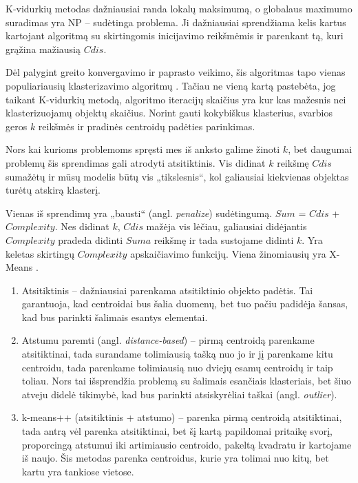 \documentclass{VUMIFInfKursinis}
\newcommand{\ltang}[2]{#1 (angl. \textit{#2})}
\begin{document}
K-vidurkių metodas dažniausiai randa lokalų maksimumą, o globalaus
maximumo suradimas yra NP – sudėtinga problema. Ji dažniausiai
sprendžiama kelis kartus kartojant algoritmą su skirtingomis inicijavimo
reikšmėmis ir parenkant tą, kuri grąžina mažiausią $Cdis$.

Dėl palygint greito konvergavimo ir paprasto veikimo, šis algoritmas
tapo vienas populiariausių klasterizavimo algoritmų
\cite{wu2008top}.
Tačiau ne vieną kartą pastebėta, jog taikant K-vidurkių metodą,
algoritmo iteracijų skaičius yra kur kas mažesnis nei klasterizuojamų
objektų skaičius. Norint gauti kokybiškus klasterius, svarbios geros
$k$ reikšmės ir pradinės centroidų padėties parinkimas.


Nors kai kurioms problemoms spręsti mes iš anksto galime žinoti
$k$, bet daugumai problemų šis sprendimas gali atrodyti
atsitiktinis. Vis didinat $k$ reikšmę $Cdis$ sumažėtų ir mūsų
modelis būtų vis „tikslesnis“, kol galiausiai kiekvienas objektas
turėtų atskirą klasterį.

Vienas iš sprendimų yra \ltang{„bausti“}{penalize} sudėtingumą.
$Sum$ = $Cdis$ + $Complexity$. Nes didinat $k$,
$Cdis$ mažėja vis lėčiau, galiausiai didėjantis $Complexity$
pradeda didinti $Suma$ reikšmę ir tada sustojame didinti $k$.
Yra keletas skirtingų $Complexity$ apskaičiavimo funkcijų. Viena
žinomiausių yra X-Means \cite{pelleg2000x}.


\begin{enumerate}
\item
  Atsitiktinis – dažniausiai parenkama atsitiktinio objekto padėtis.
  Tai garantuoja, kad centroidai bus šalia duomenų, bet tuo pačiu
  padidėja šansas, kad bus parinkti šalimais esantys elementai.
\item
  \ltang{Atstumu paremti}{distance-based} – pirmą centroidą
  parenkame atsitiktinai, tada surandame tolimiausią tašką nuo jo ir jį
  parenkame kitu centroidu, tada parenkame tolimiausią nuo dviejų esamų
  centroidų ir taip toliau. Nors tai išsprendžia problemą su šalimais
  esančiais klasteriais, bet šiuo atveju didelė tikimybė, kad bus
  parinkti \ltang{atsiskyrėliai taškai}{outlier}. 
\item
  k-means++ (atsitiktinis + atstumo) \cite{arthur2007k} – parenka pirmą
  centroidą atsitiktinai, tada antrą vėl parenka atsitiktinai, bet šį
  kartą papildomai pritaikę svorį, proporcingą atstumui iki artimiausio
  centroido, pakeltą kvadratu ir kartojame iš naujo. Šis metodas parenka
  centroidus, kurie yra tolimai nuo kitų, bet kartu yra tankiose
  vietose.
\end{enumerate}
\end{document}

